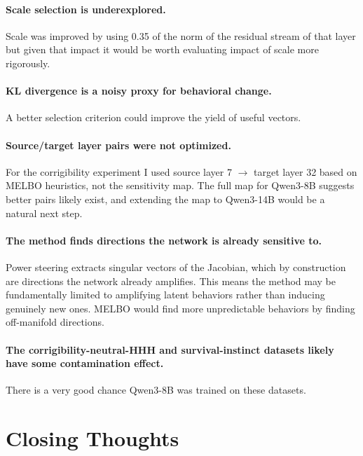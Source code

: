 \documentclass{article}
\begin{document}
\paragraph{Scale selection is underexplored.} Scale was improved by using 0.35 of the norm of the residual stream of that layer but given that impact it would be worth evaluating impact of scale more rigorously.

\paragraph{KL divergence is a noisy proxy for behavioral change.} A better selection criterion could improve the yield of useful vectors.

\paragraph{Source/target layer pairs were not optimized.} For the corrigibility experiment I used source layer 7 $\to$ target layer 32 based on MELBO heuristics, not the sensitivity map. The full map for Qwen3-8B suggests better pairs likely exist, and extending the map to Qwen3-14B would be a natural next step.

\paragraph{The method finds directions the network is already sensitive to.} Power steering extracts singular vectors of the Jacobian, which by construction are directions the network already amplifies. This means the method may be fundamentally limited to amplifying latent behaviors rather than inducing genuinely new ones. MELBO would find more unpredictable behaviors by finding off-manifold directions.

\paragraph{The corrigibility-neutral-HHH and survival-instinct datasets likely have some contamination effect.} There is a very good chance Qwen3-8B was trained on these datasets.

\section{Closing Thoughts}
\end{document}
